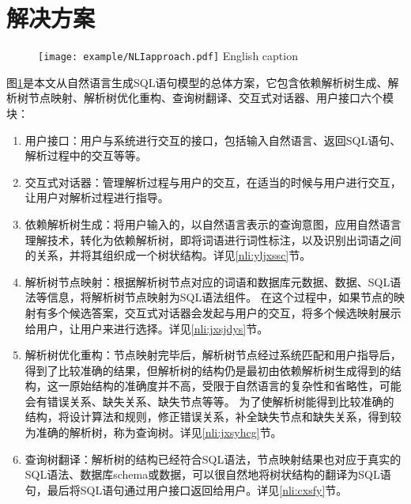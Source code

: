 \section{解决方案}
\begin{figure}[!htp]
    \centering
    \texttt{[image: example/NLIapproach.pdf]}
      {English caption}
    \label{fig:NLIapproach}
  \end{figure}
图\ref{fig:NLIapproach}是本文从自然语言生成SQL语句模型的总体方案，它包含依赖解析树生成、解析树节点映射、解析树优化重构、查询树翻译、交互式对话器、用户接口六个模块：
\begin{enumerate}
    \item 用户接口：用户与系统进行交互的接口，包括输入自然语言、返回SQL语句、解析过程中的交互等等。
    \item 交互式对话器：管理解析过程与用户的交互，在适当的时候与用户进行交互，让用户对解析过程进行指导。
    \item 依赖解析树生成：将用户输入的，以自然语言表示的查询意图，应用自然语言理解技术，转化为依赖解析树，即将词语进行词性标注，以及识别出词语之间的关系，并将其组织成一个树状结构。详见\ref{nli:yljxssc}节。
    \item 解析树节点映射：根据解析树节点对应的词语和数据库元数据、数据、SQL语法等信息，将解析树节点映射为SQL语法组件。
在这个过程中，如果节点的映射有多个候选答案，交互式对话器会发起与用户的交互，将多个候选映射展示给用户，让用户来进行选择。详见\ref{nli:jxsjdys}节。
    \item 解析树优化重构：节点映射完毕后，解析树节点经过系统匹配和用户指导后，得到了比较准确的结果，但解析树的结构仍是最初由依赖解析树生成得到的结构，这一原始结构的准确度并不高，受限于自然语言的复杂性和省略性，可能会有错误关系、缺失关系、缺失节点等等。
为了使解析树能得到比较准确的结构，将设计算法和规则，修正错误关系，补全缺失节点和缺失关系，得到较为准确的解析树，称为查询树。详见\ref{nli:jxsyhcg}节。
    \item 查询树翻译：解析树的结构已经符合SQL语法，节点映射结果也对应于真实的SQL语法、数据库schema或数据，可以很自然地将树状结构的翻译为SQL语句，最后将SQL语句通过用户接口返回给用户。详见\ref{nli:cxsfy}节。
\end{enumerate}

